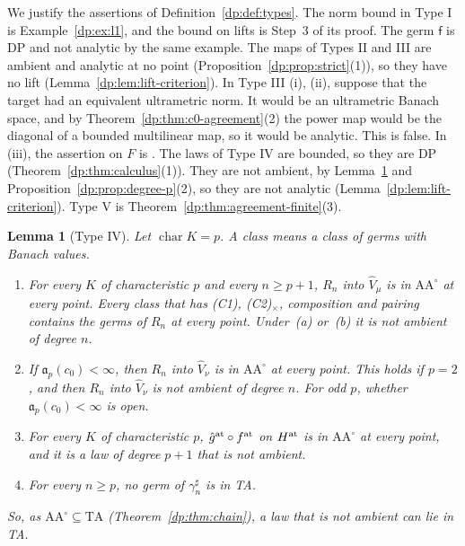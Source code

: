 \documentclass[11pt]{amsart}
\newtheorem{lemma}[theorem]{Lemma}
\theoremstyle{definition}
\theoremstyle{remark}
\numberwithin{equation}{section}
\theoremstyle{plain}
\theoremstyle{definition}
\theoremstyle{plain}
\begin{document}
We justify the assertions of Definition~\ref{dp:def:types}. The norm bound in Type I is Example~\ref{dp:ex:l1}, and the bound on lifts is Step~3 of its proof. The germ $\mathsf f$ is DP and not analytic by the same example. The maps of Types II and III are ambient and analytic at no point (Proposition~\ref{dp:prop:strict}(1)), so they have no lift (Lemma~\ref{dp:lem:lift-criterion}). In Type III (i), (ii), suppose that the target had an equivalent ultrametric norm. It would be an ultrametric Banach space, and by Theorem~\ref{dp:thm:c0-agreement}(2) the power map would be the diagonal of a bounded multilinear map, so it would be analytic. This is false. In (iii), the assertion on $F$ is \cite[Theorem~7.2(1)]{I}. The laws of Type IV are bounded, so they are DP (Theorem~\ref{dp:thm:calculus}(1)). They are not ambient, by Lemma~\ref{dp:lem:type-iv} and Proposition~\ref{dp:prop:degree-p}(2), so they are not analytic (Lemma~\ref{dp:lem:lift-criterion}). Type V is Theorem~\ref{dp:thm:agreement-finite}(3).

\begin{lemma}[Type IV]\label{dp:lem:type-iv}
Let $\operatorname{char}K=p$. A class means a class of germs with Banach values.
\begin{enumerate}
\item For every $K$ of characteristic $p$ and every $n\ge p+1$, $R_n$ into $\widehat V_\mu$ is in $\mathrm{AA}^\circ$ at every point. Every class that has \textup{(C1)}, \textup{(C2)}$_\times$, composition and pairing contains the germs of $R_n$ at every point. Under~\textup{(a)} or~\textup{(b)} it is not ambient of degree $n$.
\item If $\mathfrak a_p(c_0)<\infty$, then $R_n$ into $\widehat V_\nu$ is in $\mathrm{AA}^\circ$ at every point. This holds if $p=2$, and then $R_n$ into $\widehat V_\nu$ is not ambient of degree $n$. For odd $p$, whether $\mathfrak a_p(c_0)<\infty$ is open.
\item For every $K$ of characteristic $p$, $\hat g^{\rm at}\circ f^{\rm at}$ on $H^{\rm at}$ is in $\mathrm{AA}^\circ$ at every point, and it is a law of degree $p+1$ that is not ambient.
\item For every $n\ge p$, no germ of $\gamma^\sharp_n$ is in TA.
\end{enumerate}
So, as $\mathrm{AA}^\circ\subseteq\mathrm{TA}$ (Theorem~\ref{dp:thm:chain}), a law that is not ambient can lie in TA.
\end{lemma}
\end{document}
